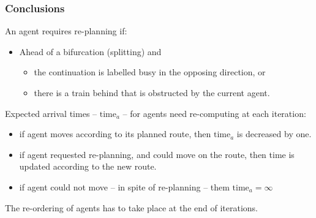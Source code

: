 \documentclass[12pt,aspectratio=169]{beamer}
\begin{document}
\begin{frame}[fragile,t]
  \frametitle{Conclusions}

An agent requires re-planning if:
\begin{itemize}
\item Ahead of a bifurcation (splitting) and
  \begin{itemize}
  \item the continuation is labelled busy in the opposing direction, \alert{or}
  \item there is a train behind that is obstructed  by the current agent.
  \end{itemize}

\end{itemize}

\vfill

\alert{Expected arrival times} -- $\mathrm{time}_{a}$ -- for agents need re-computing at \alert{each iteration}:
\begin{itemize}
\item if agent moves according to its planned route, then $\mathrm{time}_{a}$ is decreased by \alert{one}.
\item if agent requested re-planning, and could move on the route, then time is updated according to the new route.
\item if agent could not move -- in spite of re-planning -- them $\mathrm{time}_{a}=\infty$
\end{itemize}

\vfill

\begin{block}{}
\alert{The re-ordering} of agents has to take place at the end of iterations.
\end{block}

\end{frame}
\end{document}
